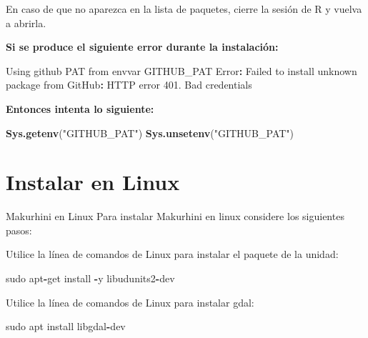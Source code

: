 \documentclass[
]{book}
\newenvironment{Shaded}{\begin{snugshade}}{\end{snugshade}}
\newcommand{\FloatTok}[1]{\textcolor[rgb]{0.00,0.00,0.81}{#1}}
\newcommand{\FunctionTok}[1]{\textcolor[rgb]{0.13,0.29,0.53}{\textbf{#1}}}
\newcommand{\NormalTok}[1]{#1}
\newcommand{\SpecialCharTok}[1]{\textcolor[rgb]{0.81,0.36,0.00}{\textbf{#1}}}
\newcommand{\StringTok}[1]{\textcolor[rgb]{0.31,0.60,0.02}{#1}}
\begin{document}
En caso de que no aparezca en la lista de paquetes, cierre la sesión de
R y vuelva a abrirla.

\textbf{Si se produce el siguiente error durante la instalación:}

\begin{Shaded}
\begin{Highlighting}[]
\NormalTok{Using github PAT}
\NormalTok{from envvar GITHUB\_PAT Error}\SpecialCharTok{:}\NormalTok{ Failed to install }\StringTok{\textquotesingle{}unknown package\textquotesingle{}}\NormalTok{ from}
\NormalTok{GitHub}\SpecialCharTok{:}\NormalTok{ HTTP error }\FloatTok{401.}\NormalTok{ Bad credentials}
\end{Highlighting}
\end{Shaded}

\textbf{Entonces intenta lo siguiente:}

\begin{Shaded}
\begin{Highlighting}[]
\FunctionTok{Sys.getenv}\NormalTok{(}\StringTok{"GITHUB\_PAT"}\NormalTok{) }
\FunctionTok{Sys.unsetenv}\NormalTok{(}\StringTok{"GITHUB\_PAT"}\NormalTok{)}
\end{Highlighting}
\end{Shaded}

\section{Instalar en Linux}\label{instalar-en-linux}

Makurhini en Linux Para instalar Makurhini en linux considere los
siguientes pasos:

Utilice la línea de comandos de Linux para instalar el paquete de la
unidad:

\begin{Shaded}
\begin{Highlighting}[]
\NormalTok{sudo apt}\SpecialCharTok{{-}}\NormalTok{get install }\SpecialCharTok{{-}}\NormalTok{y libudunits2}\SpecialCharTok{{-}}\NormalTok{dev}
\end{Highlighting}
\end{Shaded}

Utilice la línea de comandos de Linux para instalar gdal:

\begin{Shaded}
\begin{Highlighting}[]
\NormalTok{sudo apt install libgdal}\SpecialCharTok{{-}}\NormalTok{dev}
\end{Highlighting}
\end{Shaded}
\end{document}
